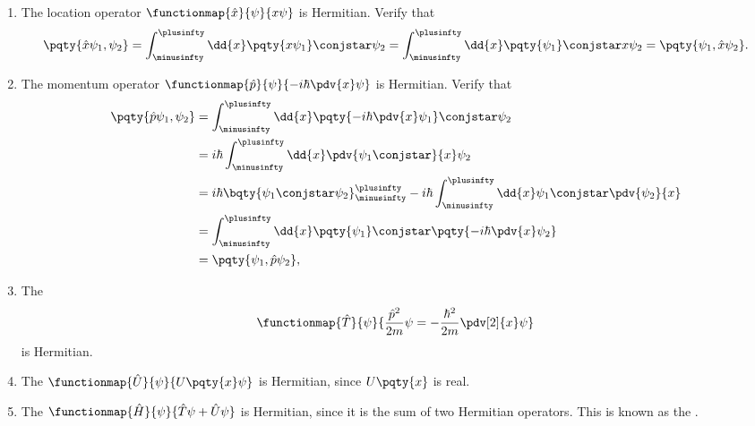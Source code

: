 \begin{examples}
    \begin{enumerate}
        \item The location operator \(\functionmap{\hat{x}}{\psi}{x \psi}\) is Hermitian. Verify that
        \begin{equation}
            \pqty{\hat{x} \psi_1, \psi_2} = \int_{\minusinfty}^{\plusinfty} \dd{x} \pqty{x \psi_1}\conjstar \psi_2 = \int_{\minusinfty}^{\plusinfty} \dd{x} \pqty{\psi_1}\conjstar x \psi_2 = \pqty{\psi_1, \hat{x} \psi_2}.
        \end{equation}

        \item The momentum operator \(\functionmap{\hat{p}}{\psi}{- i \hbar \pdv{x} \psi}\) is Hermitian. Verify that
        \begin{subequations}
            \begin{align}
                \pqty{\hat{p} \psi_1, \psi_2} &= \int_{\minusinfty}^{\plusinfty} \dd{x} \pqty{- i \hbar \pdv{x} \psi_1}\conjstar \psi_2 \\
                &= i \hbar \int_{\minusinfty}^{\plusinfty} \dd{x} \pdv{\psi_1\conjstar}{x} \psi_2 \\
                &= i \hbar \bqty{\psi_1\conjstar \psi_2}_{\minusinfty}^{\plusinfty} - i \hbar \int_{\minusinfty}^{\plusinfty} \dd{x} \psi_1\conjstar \pdv{\psi_2}{x} \\
                &= \int_{\minusinfty}^{\plusinfty} \dd{x} \pqty{\psi_1}\conjstar \pqty{- i \hbar \pdv{x} \psi_2} \\
                &= \pqty{\psi_1, \hat{p} \psi_2},
            \end{align}
        \end{subequations}

        \item The 
        \begin{equation}
            \functionmap{\hat{T}}{\psi}{\frac{\hat{p}^2}{2m} \psi = - \frac{\hbar^2}{2 m} \pdv[2]{x} \psi}
        \end{equation}
        is Hermitian.
        \item The  \(\functionmap{\hat{U}}{\psi}{U\pqty{x} \psi}\) is Hermitian, since \(U\pqty{x}\) is real.
        \item The  \(\functionmap{\hat{H}}{\psi}{\hat{T} \psi + \hat{U} \psi}\) is Hermitian, since it is the sum of two Hermitian operators. This is known as the .
    \end{enumerate}
\end{examples}

